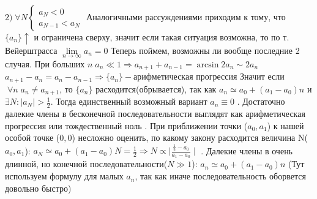 	$2)\; \forall N 	
	\begin{cases}
		a_N < 0
		\\
		a_{N-1} < a_N
	\end{cases}$
	\newline
	Аналогичными рассуждениями приходим к тому, что $\{a_n\} \uparrow$ и ограничена сверху, значит если такая ситуация возможна, то по т. Вейерштрасса $\lim\limits_{n \rightarrow \infty} a_n = 0$
	\newline
	Теперь поймем, возможны ли вообще последние 2 случая.
	\newline
	При больших $n \; a_n \ll 1 \Rightarrow a_{n+1}+a_{n-1} = \arcsin 2a_{n} \sim 2a_n$
	\newline
	 $a_{n+1}-a_{n} = a_{n} - a_{n-1} \Rightarrow \{a_n\} - \text{арифметическая прогрессия}$
	\newline
	Значит если $\; \forall n \; a_n \neq a_{n+1}$, то $\{a_n\}$ расходится(обрывается), так как $a_n \simeq a_0 + (a_1-a_0)n$ и $\exists N: \mid a_N \mid > \frac{1}{2}$.
	\newline
	Тогда единственный возможный вариант $a_n \equiv 0$
	. Достаточно далекие члены в бесконечной последовательности выглядят как арифметическая прогрессия или тождественный ноль
	. При приближении точки ($a_0,a_1$) к нашей особой точке ($0,0$) несложно оценить, по какому закону расходится величина N($a_0,a_1$):  
	\newline
	$a_N \simeq a_0 + (a_1-a_0)N = \frac{1}{2} \Rightarrow N \propto \mid \frac{\frac{1}{2}-a_0}{a_1-a_0} \mid$
	. Далекие члены в очень длинной, но конечной последовательности($N \gg 1$):
	\newline
	$a_n \simeq a_0 + (a_1-a_0)n$
	\newline
	(Тут используем формулу для малых $a_n$, так как иначе последовательность оборвется довольно быстро)
	 

